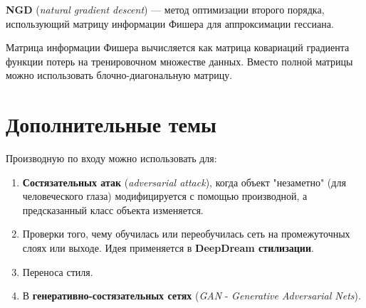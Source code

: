 \begin{definition}
    \textbf{NGD} (\textit{natural gradient descent}) --- метод оптимизации второго порядка, использующий матрицу информации Фишера для аппроксимации гессиана. 
    \begin{remark}
        Матрица информации Фишера вычисляется как матрица ковариаций градиента функции потерь на тренировочном множестве данных. Вместо полной матрицы можно использовать блочно-диагональную матрицу.
    \end{remark}
\end{definition}

\section{Дополнительные темы}

Производную по входу можно использовать для:
\begin{enumerate}
    \item \textbf{Состязательных атак} (\textit{adversarial attack}), когда объект "незаметно" (для человеческого глаза) модифицируется с помощью производной, а предсказанный класс объекта изменяется.
    \item Проверки того, чему обучилась или переобучилась сеть на промежуточных слоях или выходе. Идея применяется в \textbf{DeepDream стилизации}.
    \item Переноса стиля.
    \item В \textbf{генеративно-состязательных сетях} (\textit{GAN} - \textit{Generative Adversarial Nets}).
\end{enumerate}